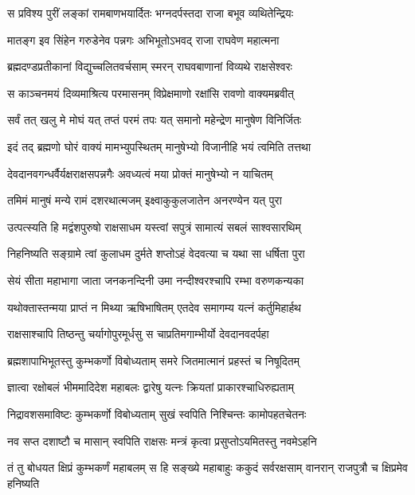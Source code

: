 
\twolineshloka
{स प्रविश्य पुरीं लङ्कां रामबाणभयार्दितः}
{भग्नदर्पस्तदा राजा बभूव व्यथितेन्द्रियः} %

\twolineshloka
{मातङ्ग इव सिंहेन गरुडेनेव पन्नगः}
{अभिभूतोऽभवद् राजा राघवेण महात्मना} %

\twolineshloka
{ब्रह्मदण्डप्रतीकानां विद्युच्चलितवर्चसाम्}
{स्मरन् राघवबाणानां विव्यथे राक्षसेश्वरः} %

\twolineshloka
{स काञ्चनमयं दिव्यमाश्रित्य परमासनम्}
{विप्रेक्षमाणो रक्षांसि रावणो वाक्यमब्रवीत्} %

\twolineshloka
{सर्वं तत् खलु मे मोघं यत् तप्तं परमं तपः}
{यत् समानो महेन्द्रेण मानुषेण विनिर्जितः} %

\twolineshloka
{इदं तद् ब्रह्मणो घोरं वाक्यं मामभ्युपस्थितम्}
{मानुषेभ्यो विजानीहि भयं त्वमिति तत्तथा} %

\twolineshloka
{देवदानवगन्धर्वैर्यक्षराक्षसपन्नगैः}
{अवध्यत्वं मया प्रोक्तं मानुषेभ्यो न याचितम्} %

\twolineshloka
{तमिमं मानुषं मन्ये रामं दशरथात्मजम्}
{इक्ष्वाकुकुलजातेन अनरण्येन यत् पुरा} %

\twolineshloka
{उत्पत्स्यति हि मद्वंशपुरुषो राक्षसाधम}
{यस्त्वां सपुत्रं सामात्यं सबलं साश्वसारथिम्} %

\twolineshloka
{निहनिष्यति सङ्ग्रामे त्वां कुलाधम दुर्मते}
{शप्तोऽहं वेदवत्या च यथा सा धर्षिता पुरा} %

\twolineshloka
{सेयं सीता महाभागा जाता जनकनन्दिनी}
{उमा नन्दीश्वरश्चापि रम्भा वरुणकन्यका} %

\twolineshloka
{यथोक्तास्तन्मया प्राप्तं न मिथ्या ऋषिभाषितम्}
{एतदेव समागम्य यत्नं कर्तुमिहार्हथ} %

\twolineshloka
{राक्षसाश्चापि तिष्ठन्तु चर्यागोपुरमूर्धसु}
{स चाप्रतिमगाम्भीर्यो देवदानवदर्पहा} %

\twolineshloka
{ब्रह्मशापाभिभूतस्तु कुम्भकर्णो विबोध्यताम्}
{समरे जितमात्मानं प्रहस्तं च निषूदितम्} %

\twolineshloka
{ज्ञात्वा रक्षोबलं भीममादिदेश महाबलः}
{द्वारेषु यत्नः क्रियतां प्राकारश्चाधिरुह्यताम्} %

\twolineshloka
{निद्रावशसमाविष्टः कुम्भकर्णो विबोध्यताम्}
{सुखं स्वपिति निश्चिन्तः कामोपहतचेतनः} %

\twolineshloka
{नव सप्त दशाष्टौ च मासान् स्वपिति राक्षसः}
{मन्त्रं कृत्वा प्रसुप्तोऽयमितस्तु नवमेऽहनि} %

\threelineshloka
{तं तु बोधयत क्षिप्रं कुम्भकर्णं महाबलम्}
{स हि सङ्ख्ये महाबाहुः ककुदं सर्वरक्षसाम्}
{वानरान् राजपुत्रौ च क्षिप्रमेव हनिष्यति} %


